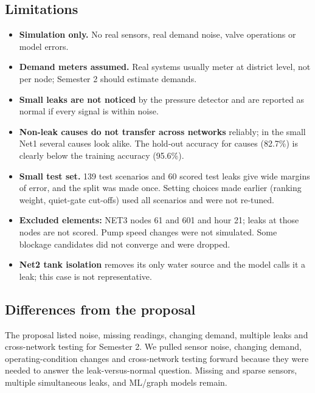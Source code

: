 \documentclass[11pt,a4paper]{article}
\begin{document}
\subsection{Limitations}
\begin{itemize}[itemsep=2pt]
\item \textbf{Simulation only.} No real sensors, real demand noise, valve operations or model errors.
\item \textbf{Demand meters assumed.} Real systems usually meter at district level, not per node; Semester 2 should estimate demands.
\item \textbf{Small leaks are not noticed} by the pressure detector and are reported as normal if every signal is within noise.
\item \textbf{Non-leak causes do not transfer across networks} reliably; in the small Net1 several causes look alike. The hold-out accuracy for causes (82.7\%) is clearly below the training accuracy (95.6\%).
\item \textbf{Small test set.} 139 test scenarios and 60 scored test leaks give wide margins of error, and the split was made once. Setting choices made earlier (ranking weight, quiet-gate cut-offs) used all scenarios and were not re-tuned.
\item \textbf{Excluded elements:} NET3 nodes 61 and 601 and hour 21; leaks at those nodes are not scored. Pump speed changes were not simulated. Some blockage candidates did not converge and were dropped.
\item \textbf{Net2 tank isolation} removes its only water source and the model calls it a leak; this case is not representative.
\end{itemize}

\subsection{Differences from the proposal}
The proposal listed noise, missing readings, changing demand, multiple leaks and cross-network testing for Semester 2. We pulled sensor noise, changing demand, operating-condition changes and cross-network testing forward because they were needed to answer the leak-versus-normal question. Missing and sparse sensors, multiple simultaneous leaks, and ML/graph models remain.
\end{document}
